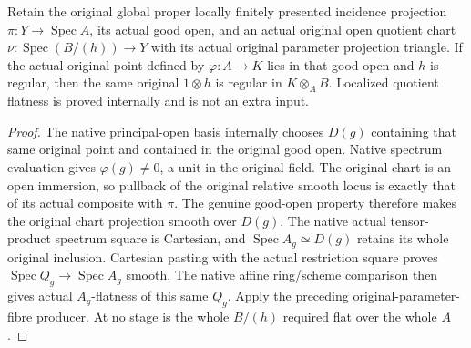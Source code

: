 \begin{theorem}
\label{thm:kn-nadel-bertini-snc-flat-good-parameter}
\leanok
Retain the original global proper locally finitely presented incidence
projection $\pi:Y\to\operatorname{Spec}A$, its actual good open, and an
actual original open quotient chart
$\nu:\operatorname{Spec}(B/(h))\to Y$ with its actual original parameter
projection triangle.  If the actual original point defined by
$\varphi:A\to K$ lies in that good open and $h$ is regular, then the same
original $1\otimes h$ is regular in $K\otimes_A B$.  Localized quotient
flatness is proved internally and is not an extra input.
\end{theorem}
\begin{proof}
The native principal-open basis internally chooses $D(g)$ containing
that same original point and contained in the original good open.  Native
spectrum evaluation gives $\varphi(g)\ne0$, a unit in the original field.
The original chart is an open immersion, so pullback of the original
relative smooth locus is exactly that of its actual composite with $\pi$.
The genuine good-open property therefore makes the original chart
projection smooth over $D(g)$.  The native actual tensor-product spectrum
square is Cartesian, and $\operatorname{Spec}A_g\simeq D(g)$ retains its
whole original inclusion.  Cartesian pasting with the actual restriction
square proves $\operatorname{Spec}Q_g\to\operatorname{Spec}A_g$ smooth.
The native affine ring/scheme comparison then gives actual $A_g$-flatness
of this same $Q_g$.  Apply the preceding original-parameter-fibre producer.
At no stage is the whole $B/(h)$ required flat over the whole $A$.
\end{proof}

